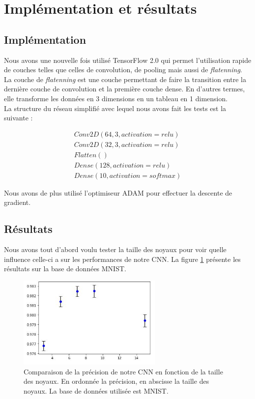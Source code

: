 \section{Implémentation et résultats}

\subsection{Implémentation}

Nous avons une nouvelle fois utilisé TensorFlow 2.0 qui permet l'utilisation rapide de couches telles que celles de convolution, de pooling mais aussi de \textit{flatenning}. La couche de \textit{flatenning} est une couche permettant de faire la transition entre la dernière couche de convolution et la première couche dense. En d'autres termes, elle transforme les données en 3 dimensions en un tableau en 1 dimension.\\
La structure du réseau simplifié avec lequel nous avons fait les tests est la suivante :

\[ \begin{array}{lcr}
	Conv2D(64, 3, activation=relu) \\
    Conv2D(32, 3, activation=relu) \\
    Flatten() \\
    Dense(128, activation=relu) \\
    Dense(10, activation=softmax)\end{array}\]

Nous avons de plus utilisé l'optimiseur ADAM pour effectuer la descente de gradient.

\subsection{Résultats}

Nous avons tout d'abord voulu tester la taille des noyaux pour voir quelle influence celle-ci a sur les performances de notre CNN. La figure \ref{resultat_noyaux} présente les résultats sur la base de données MNIST.

\begin{figure}[!h]
\centering
\includegraphics[width=200pt]{images/cnn/resultat_noyau.png}
\caption{Comparaison de la précision de notre CNN en fonction de la taille des noyaux. En ordonnée la précision, en abscisse la taille des noyaux. La base de données utilisée est MNIST.}
\label{resultat_noyaux}
\end{figure}

